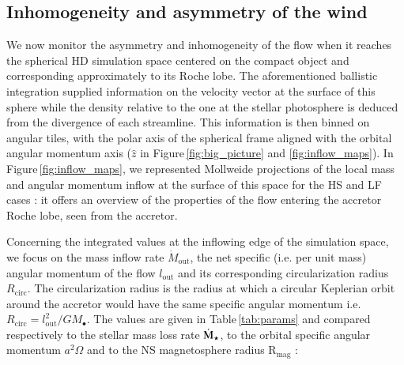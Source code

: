 \documentclass{aa}
\makeatletter
\newcommand*{\ns}{NS\@\xspace}
\newcommand*{\eg}{e.g.\@\xspace}
\newcommand*{\ie}{i.e.\@\xspace}
\newcommand*{\aka}{a.k.a. \@\xspace}
\newcommand{\mystar}{{\fontfamily{lmr}\selectfont$\star$}}
\makeatother
\begin{document}
\subsection{Inhomogeneity and asymmetry of the wind}
\label{sec:orb_inhomo}

We now monitor the asymmetry and inhomogeneity of the flow when it reaches the spherical HD simulation space centered on the compact object and corresponding approximately to its Roche lobe. The aforementioned ballistic integration supplied information on the velocity vector at the surface of this sphere while the density relative to the one at the stellar photosphere is deduced from the divergence of each streamline. This information is then binned on angular tiles, with the polar axis of the spherical frame aligned with the orbital angular momentum axis ($\hat{z}$ in Figure\,\ref{fig:big_picture} and \ref{fig:inflow_maps}). In Figure\,\ref{fig:inflow_maps}, we represented Mollweide projections of the local mass and angular momentum inflow at the surface of this space for the HS and LF cases : it offers an overview of the properties of the flow entering the accretor Roche lobe, seen from the accretor. 

Concerning the integrated values at the inflowing edge of the simulation space, we focus on the mass inflow rate $\dot{M}_{\text{out}}$, the net specific (\ie per unit mass) angular momentum of the flow $l_{\text{out}}$ and its corresponding circularization radius $R_{\text{circ}}$. The circularization radius is the radius at which a circular Keplerian orbit around the accretor would have the same specific angular momentum \ie $R_{\text{circ}}=l_{\text{out}}^2/GM_{\bullet}$. The values are given in Table\,\ref{tab:params} and compared respectively to the stellar mass loss rate $\dot{\text{M}}_{\text{\mystar}}$, to the orbital specific angular momentum $a^2\Omega$ and to the \ns magnetosphere radius R$_{\text{mag}}$ \citep[see \eg][]{Frank2002} :


\end{document}

